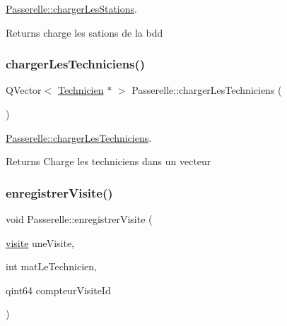 \hyperlink{class_passerelle_a58f4340157dc6a2b5f720cf7ab09c980}{Passerelle\+::charger\+Les\+Stations}. 

\begin{DoxyReturn}{Returns}
charge les sations de la bdd 
\end{DoxyReturn}
\mbox{\label{class_passerelle_a231a84d255da1885456f4637d4c88ee5}} 
\subsubsection{\texorpdfstring{charger\+Les\+Techniciens()}{chargerLesTechniciens()}}
{\footnotesize\ttfamily Q\+Vector$<$ \hyperlink{class_technicien}{Technicien} $\ast$ $>$ Passerelle\+::charger\+Les\+Techniciens (\begin{DoxyParamCaption}{ }\end{DoxyParamCaption})\hspace{0.3cm}{\ttfamily [static]}}



\hyperlink{class_passerelle_a231a84d255da1885456f4637d4c88ee5}{Passerelle\+::charger\+Les\+Techniciens}. 

\begin{DoxyReturn}{Returns}
Charge les techniciens dans un vecteur 
\end{DoxyReturn}
\mbox{\label{class_passerelle_a82488527c9e08f60c905c0ec8a95187a}} 
\subsubsection{\texorpdfstring{enregistrer\+Visite()}{enregistrerVisite()}}
{\footnotesize\ttfamily void Passerelle\+::enregistrer\+Visite (\begin{DoxyParamCaption}\item[{\hyperlink{classvisite}{visite}}]{une\+Visite,  }\item[{int}]{mat\+Le\+Technicien,  }\item[{qint64}]{compteur\+Visite\+Id }\end{DoxyParamCaption})\hspace{0.3cm}{\ttfamily [static]}}




